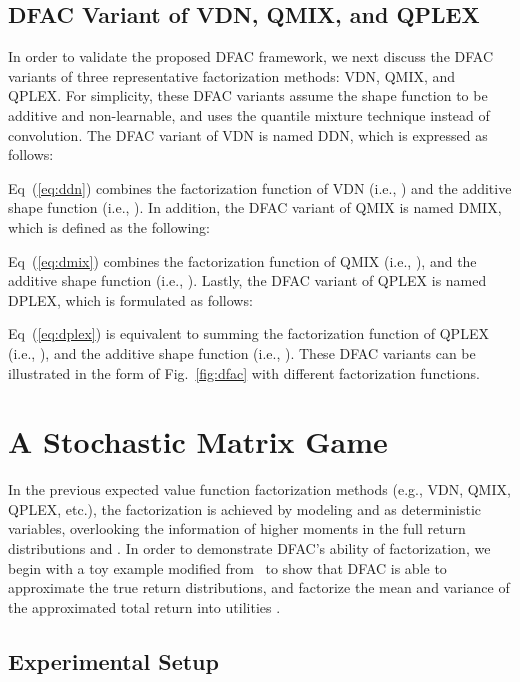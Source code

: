 \documentclass[twoside,11pt]{article}
\newcommand{\ddn}{DDN}
\newcounter{example0}
\begin{document}
\subsection{DFAC Variant of VDN, QMIX, and QPLEX}
\label{subsec:methodology_distributional_variant_of_vdn_and_qmix}

In order to validate the proposed DFAC framework, we next discuss the DFAC variants of three representative factorization methods: VDN, QMIX, and QPLEX.
For simplicity, these DFAC variants assume the shape function to be additive and non-learnable, and uses the quantile mixture technique instead of convolution.
The DFAC variant of VDN is named \ddn{}, which is expressed as follows:

Eq~(\ref{eq:ddn}) combines the factorization function of VDN (i.e., ) and the additive shape function (i.e.,  ).
In addition, the DFAC variant of QMIX is named DMIX, which is defined as the following:

Eq~(\ref{eq:dmix}) combines the factorization function of QMIX (i.e., ), and the additive shape function (i.e., ). Lastly, the DFAC variant of QPLEX is named DPLEX, which is formulated as follows:

Eq~(\ref{eq:dplex})  is equivalent to summing the factorization function of QPLEX (i.e., ), and the additive shape function (i.e., ).
These DFAC variants can be illustrated in the form of Fig.~\ref{fig:dfac} with different factorization functions.
 \section{A Stochastic Matrix Game}
\label{sec:distributional_2_step_game}

In the previous expected value function factorization methods (e.g., VDN, QMIX, QPLEX, etc.), the factorization is achieved by modeling  and  as deterministic variables, overlooking the information of higher moments in the full return distributions  and .
In order to demonstrate DFAC's ability of factorization, we begin with a toy example modified from~\cite{Wang2020QPLEX} to show that DFAC is able to approximate the true return distributions, and factorize the mean and variance of the approximated total return  into utilities .



\subsection{Experimental Setup}
\label{subsec:matrix_game_setup}
\end{document}
